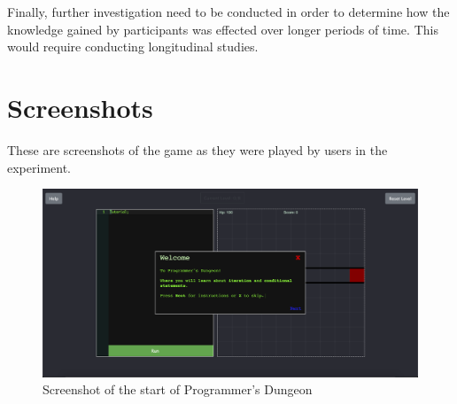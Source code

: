 \documentclass[a4paper,11.5pt]{report}
\numberwithin{figure}{section}
\numberwithin{table}{section}
\numberwithin{equation}{section}
\numberwithin{equation}{section}
\newcommand\blankpage{%
    \null
    \thispagestyle{empty}%
    \addtocounter{page}{-1}%
    \newpage}
\begin{document}
Finally, further investigation need to be conducted in order to determine how the knowledge gained by participants was effected over longer periods of time. This would require conducting longitudinal studies. 



\afterpage{\blankpage}






\appendix
{}
\appendixpage

\renewcommand\chaptername{Appendix}

\newpage

\chapter{Screenshots} \label{app:screenshots}

These are screenshots of the game as they were played by users in the experiment. 

\begin{figure}[H]
 \centering
    \includegraphics[width=1\textwidth]{startgame}
       \captionsetup{justification=centering}
\caption{Screenshot of the start of Programmer's Dungeon}
\label{fig:startgame}
\end{figure}
\end{document}
